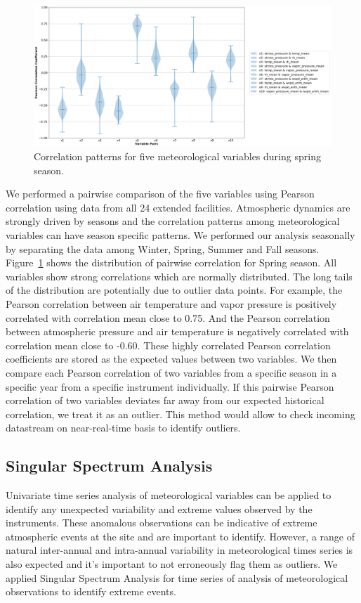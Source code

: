 \begin{figure}[ht]
    \centering
    \includegraphics[width=\textwidth]{figures/Spring.png}
    \caption{Correlation patterns for five meteorological variables
		during spring season.}
    \label{fig:pc}
\end{figure}

We performed a pairwise comparison of the five variables using Pearson
correlation using data from all 24 extended facilities. Atmospheric
dynamics are strongly driven by seasons and the correlation patterns
among meteorological variables can have season specific patterns. We
performed our analysis seasonally by separating the data among Winter, Spring,
Summer and Fall seasons. Figure~\ref{fig:pc} shows the distribution of
pairwise correlation for Spring season. All variables show strong
correlations which are normally distributed. The long tails of the
distribution are potentially due to outlier data points. 
For example, the Pearson correlation between
air temperature and vapor pressure is positively
correlated with correlation mean close to 0.75. And the Pearson
correlation between atmospheric pressure and air temperature is
negatively correlated with correlation mean close to -0.60. These highly
correlated Pearson correlation coefficients are stored as the expected
values between two variables. We then compare each Pearson correlation
of two variables from a specific season in a specific year from a
specific instrument individually. If this pairwise Pearson correlation
of two variables deviates far away from our expected historical
correlation, we treat it as an outlier. This method would allow to check
incoming datastream on near-real-time basis to identify outliers.

\subsection{Singular Spectrum Analysis}
Univariate time series analysis of meteorological variables can be
applied to identify any unexpected variability and extreme values
observed by the instruments. These anomalous observations can be
indicative of extreme atmospheric events at the site and are important
to identify. However, a range of natural inter-annual and intra-annual variability in
meteorological times series is also expected and it's important to not
erroneously flag them as outliers. We applied Singular Spectrum Analysis
for time series of analysis of meteorological observations to identify
extreme events.

